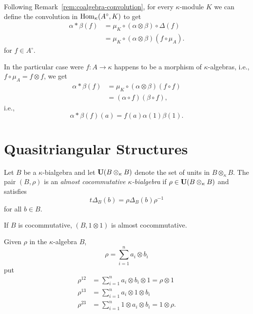 \begin{rem}
    Following Remark~\ref{rem:coalgebra-convolution}, for every $\kappa$-module $K$ we can define the convolution in ${\rm Hom}_\kappa(A^\circ,K)$ to get
    \begin{align*}
        \alpha*\beta(f)
            &= \mu_K\circ(\alpha\otimes\beta)\circ\Delta(f)\\
            &= \mu_K\circ(\alpha\otimes\beta)(f\circ\mu_A).
    \end{align*}
    for $f\in A^\circ$.
    
    In the particular case were $f\colon A\to\kappa$ happens to be a morphism of $\kappa$-algebras, i.e., $f\circ\mu_A=f\otimes f$, we get
    \begin{align*}
        \alpha*\beta(f) &= \mu_K\circ(\alpha\otimes\beta)(f\circ f)\\
            &= (\alpha\circ f)(\beta\circ f),
    \end{align*}
    i.e.,
    $$
        \alpha*\beta(f)(a)=f(a)\alpha(1)\beta(1).
    $$
\end{rem}

\section{Quasitriangular Structures}

\begin{defn}
    Let $B$ be a $\kappa$-bialgebra and let $\mathbf U(B\otimes_\kappa B)$ denote the set of units in $B\otimes_\kappa B$. The pair $(B,\rho)$ is an \textsl{almost cocommutative $\kappa$-bialgebra} if  $\rho\in\mathbf U(B\otimes_\kappa B)$ and satisfies
    $$
        t\Delta_B(b) = \rho\Delta_B(b)\rho^{-1}
    $$
    for all $b\in B$.
\end{defn}

\begin{rem}
    If $B$ is cocommutative, $(B,1\otimes1)$ is almost cocommutative.
\end{rem}

\begin{ntn}
    Given\/ $\rho$ in the\/ $\kappa$-algebra\/ $B$,
    $$
        \rho = \sum_{i=1}^na_i\otimes b_i
    $$
    put
    \begin{align*}
        \rho^{12} &= \sum_{i=1}^na_i\otimes b_i\otimes1=\rho\otimes1\\
        \rho^{13} &= \sum_{i=1}^na_i\otimes1\otimes b_i\\
        \rho^{23} &= \sum_{i=1}^n1\otimes a_i\otimes b_i = 1\otimes\rho.
    \end{align*}
\end{ntn}

